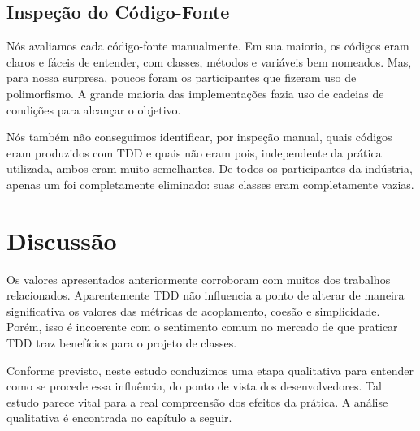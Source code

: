 \subsection{Inspeção do Código-Fonte}

Nós avaliamos cada código-fonte manualmente.
Em sua maioria, os códigos eram claros e fáceis de entender,
com classes, métodos e variáveis bem nomeados.
Mas, para nossa surpresa,
poucos foram os participantes que fizeram uso de polimorfismo. A grande
maioria das implementações fazia uso de cadeias de condições para 
alcançar o objetivo.

Nós também não conseguimos identificar, por inspeção manual, quais códigos
eram produzidos com TDD e quais não eram pois, independente
da prática utilizada, ambos eram muito semelhantes.
De todos os participantes da indústria, apenas um foi completamente eliminado:
suas classes eram completamente vazias. 


\section{Discussão}

Os valores apresentados anteriormente corroboram com muitos dos trabalhos relacionados. 
Aparentemente TDD não influencia a ponto de alterar 
de maneira significativa os valores das métricas de acoplamento, coesão e simplicidade.
Porém, isso é incoerente com o sentimento comum no mercado de que praticar TDD
traz benefícios para o projeto de classes. 

Conforme previsto, neste estudo conduzimos
uma etapa qualitativa para entender como se procede essa influência, do ponto
de vista dos desenvolvedores. Tal estudo parece vital para a real compreensão
dos efeitos da prática. A análise qualitativa é encontrada no capítulo a seguir.


